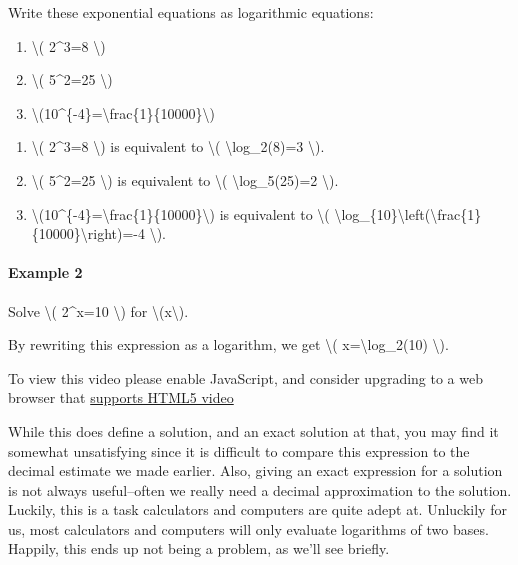Write these exponential equations as logarithmic equations:

\begin{enumerate}
\tightlist
\item
  \textbackslash{}( 2\^{}3=8 \textbackslash{})
\item
  \textbackslash{}( 5\^{}2=25 \textbackslash{})
\item
  \textbackslash{}(10\^{}\{-4\}=\textbackslash{}frac\{1\}\{10000\}\textbackslash{})
\end{enumerate}

\begin{enumerate}
\tightlist
\item
  \textbackslash{}( 2\^{}3=8 \textbackslash{}) is equivalent to
  \textbackslash{}( \textbackslash{}log\_2(8)=3 \textbackslash{}).
\item
  \textbackslash{}( 5\^{}2=25 \textbackslash{}) is equivalent to
  \textbackslash{}( \textbackslash{}log\_5(25)=2 \textbackslash{}).
\item
  \textbackslash{}(10\^{}\{-4\}=\textbackslash{}frac\{1\}\{10000\}\textbackslash{})
  is equivalent to \textbackslash{}(
  \textbackslash{}log\_\{10\}\textbackslash{}left(\textbackslash{}frac\{1\}\{10000\}\textbackslash{}right)=-4
  \textbackslash{}).
\end{enumerate}

\hypertarget{example-2}{%
\paragraph{Example 2}\label{example-2}}

Solve \textbackslash{}( 2\^{}x=10 \textbackslash{}) for
\textbackslash{}(x\textbackslash{}).

By rewriting this expression as a logarithm, we get \textbackslash{}(
x=\textbackslash{}log\_2(10) \textbackslash{}).

To view this video please enable JavaScript, and consider upgrading to a
web browser that \href{http://videojs.com/html5-video-support/}{supports
HTML5 video}

While this does define a solution, and an exact solution at that, you
may find it somewhat unsatisfying since it is difficult to compare this
expression to the decimal estimate we made earlier. Also, giving an
exact expression for a solution is not always useful--often we really
need a decimal approximation to the solution. Luckily, this is a task
calculators and computers are quite adept at. Unluckily for us, most
calculators and computers will only evaluate logarithms of two bases.
Happily, this ends up not being a problem, as we'll see briefly.

